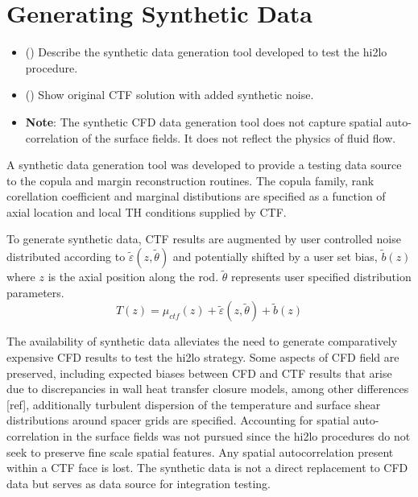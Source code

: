 

\section{Generating Synthetic Data}

\begin{itemize}
	\item (\checkmark) Describe the synthetic data generation tool developed to test the hi2lo procedure.
	\item (\checkmark) Show original CTF solution with added synthetic noise.
	\item \textbf{Note}: The synthetic CFD data generation tool does not capture spatial auto-correlation of the surface fields.  It does not reflect
	the physics of fluid flow.
\end{itemize}

A synthetic data generation tool was developed to provide a testing data source to the copula and margin reconstruction routines.  The copula family, rank corellation coefficient and marginal distibutions are specified as a function of axial location and local TH conditions supplied by CTF.

To generate synthetic data, CTF results are augmented by user controlled noise distributed according to
$\tilde \varepsilon(z, \tilde \theta)$
and potentially shifted by a user set bias,
$\tilde b(z)$ where $z$ is the axial position along the rod.
$\tilde \theta$ represents user specified distribution parameters.
\begin{equation}
T(z) = \mu_{ctf}(z) + \tilde \varepsilon (z, \tilde \theta) + \tilde b(z)
\end{equation}


The availability of synthetic data alleviates the need to generate comparatively expensive CFD results to test the hi2lo strategy.  Some aspects of CFD field are preserved, including expected biases between CFD and CTF results that arise due to discrepancies in wall heat transfer closure models, among other differences [ref], additionally turbulent dispersion of the temperature and surface shear distributions around spacer grids are specified.  Accounting for spatial auto-correlation in the surface fields was not pursued since the hi2lo procedures do not seek to preserve fine scale spatial features.  Any spatial autocorrelation present within a CTF face is lost.  The synthetic data is not a direct replacement to CFD data but serves as data source for integration testing.

